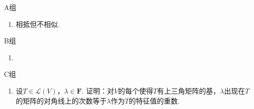 \vspace{2ex}
{\kaishu }
\begin{flushright}
    \kaishu

\end{flushright}

\centerline{\heiti A组}
\begin{enumerate}
    \item 相抵但不相似.
\end{enumerate}

\centerline{\heiti B组}
\begin{enumerate}
    \item
\end{enumerate}

\centerline{\heiti C组}
\begin{enumerate}
    \item 设$T\in \mathcal{L}(V)$，$\lambda\in\mathbf{F}$. 证明：对$V$的每个使得$T$有上三角矩阵的基，$\lambda$出现在$T$的矩阵的对角线上的次数等于$\lambda$作为$T$的特征值的重数.
\end{enumerate}
